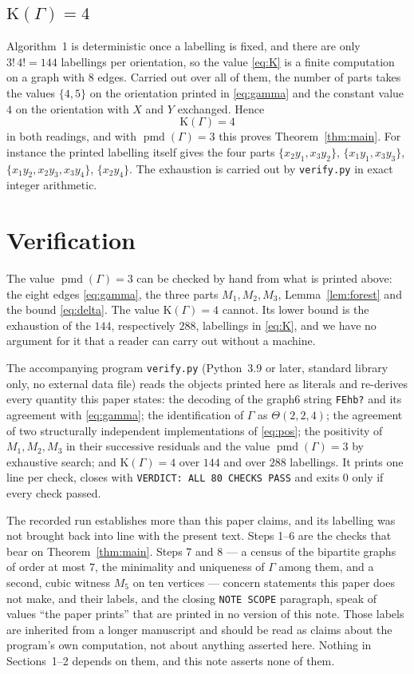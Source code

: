 \documentclass[11pt]{amsart}
\theoremstyle{remark}
\newcommand{\pmd}{\operatorname{pmd}}
\newcommand{\Kinv}{\mathrm{K}}
\newcommand{\Gam}{\Gamma}
\begin{document}
\subsection*{$\Kinv(\Gam)=4$}

Algorithm~1 is deterministic once a labelling is fixed, and there are only
$3!\,4!=144$ labellings per orientation, so the value \eqref{eq:K} is a finite
computation on a graph with $8$ edges. Carried out over all of them, the number
of parts takes the values
$\{4,5\}$ on the orientation printed in \eqref{eq:gamma} and the constant value
$4$ on the orientation with $X$ and $Y$ exchanged. Hence
\[
  \Kinv(\Gam)=4
\]
in both readings, and with $\pmd(\Gam)=3$ this proves Theorem~\ref{thm:main}.
For instance the printed labelling itself gives the four parts
$\{x_2y_1,x_3y_2\}$, $\{x_1y_1,x_3y_3\}$, $\{x_1y_2,x_2y_3,x_3y_4\}$,
$\{x_2y_4\}$. The exhaustion is carried out by \texttt{verify.py} in exact
integer arithmetic.

\section{Verification}

The value $\pmd(\Gam)=3$ can be checked by hand from what is printed above: the
eight edges \eqref{eq:gamma}, the three parts $M_1,M_2,M_3$,
Lemma~\ref{lem:forest} and the bound \eqref{eq:delta}. The value
$\Kinv(\Gam)=4$ cannot. Its lower bound is the exhaustion of the $144$,
respectively $288$, labellings in \eqref{eq:K}, and we have no argument for it
that a reader can carry out without a machine.

The accompanying program \texttt{verify.py} (Python~3.9 or later, standard
library only, no external data file) reads the objects printed here as literals
and re-derives every quantity this paper states: the decoding of the graph6
string \texttt{FEhb?} and its agreement with \eqref{eq:gamma}; the
identification of $\Gam$ as $\Theta(2,2,4)$; the agreement of two structurally
independent implementations of \eqref{eq:pos}; the positivity of $M_1,M_2,M_3$
in their successive residuals and the value $\pmd(\Gam)=3$ by exhaustive
search; and $\Kinv(\Gam)=4$ over $144$ and over $288$ labellings. It prints one
line per check, closes with \texttt{VERDICT: ALL 80 CHECKS PASS} and exits $0$
only if every check passed.

The recorded run establishes more than this paper claims, and its labelling was
not brought back into line with the present text. Steps 1--6 are the checks that
bear on Theorem~\ref{thm:main}. Steps 7 and 8 --- a census of the bipartite
graphs of order at most $7$, the minimality and uniqueness of $\Gam$ among them,
and a second, cubic witness $M_5$ on ten vertices --- concern statements this
paper does not make, and their labels, and the closing \texttt{NOTE SCOPE}
paragraph, speak of values ``the paper prints'' that are printed in no version
of this note. Those labels are inherited from a longer manuscript and should be
read as claims about the program's own computation, not about anything asserted
here. Nothing in Sections~1--2 depends on them, and this note asserts none of
them.
\end{document}
